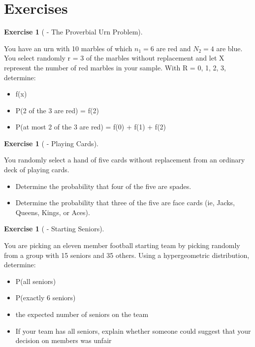 \documentclass[10pt,]{book}
\theoremstyle{plain}
\theoremstyle{definition}
\theoremstyle{definition}
\theoremstyle{definition}
\newtheorem{exercise}[theorem]{Exercise}
\numberwithin{equation}{section}
\begin{document}
\section[{Exercises}]{Exercises}\label{section-34}
\begin{exercise}[{ - The Proverbial Urn Problem}]\label{exercise-46}

You have an urn with 10 marbles of which \(n_1 = 6\) are red and \(N_2 = 4\) are blue. You select randomly r = 3 of the marbles without replacement and let X represent the number of red marbles in your sample. With R = {0, 1, 2, 3}, determine:
\leavevmode%
\begin{itemize}[label=\textbullet]
\item{}f(x)%
\item{}P(2 of the 3 are red) = f(2)%
\item{}P(at most 2 of the 3 are red) = f(0) + f(1) + f(2)%
\end{itemize}
 
%
\end{exercise}
\begin{exercise}[{ - Playing Cards}]\label{exercise-47}

You randomly select a hand of five cards without replacement from an ordinary deck of playing cards.  
\leavevmode%
\begin{itemize}[label=\textbullet]
\item{}Determine the probability that four of the five are spades.%
\item{}Determine the probability that three of the five are face cards (ie, Jacks, Queens, Kings, or Aces).%
\end{itemize}

%
\end{exercise}
\begin{exercise}[{ - Starting Seniors}]\label{exercise-48}

You are picking an eleven member football starting team by picking randomly from a group with 15 seniors and 35 others.  Using a hypergeometric distribution, determine:
\leavevmode%
\begin{itemize}[label=\textbullet]
\item{}P(all seniors)%
\item{}P(exactly 6 seniors)%
\item{}the expected number of seniors on the team%
\item{}If your team has all seniors, explain whether someone could suggest that your decision on members was unfair%
\end{itemize}

%
\end{exercise}
\end{document}
